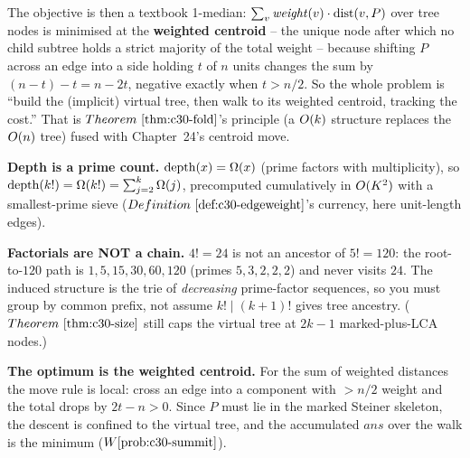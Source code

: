 The objective is then a textbook 1-median: \(\sum_v \mathit{weight}(v)\cdot\operatorname{dist}(v,P)\) over tree
nodes is minimised at the \textbf{weighted centroid} -- the unique node after which no child
subtree holds a strict majority of the total weight -- because shifting \(P\) across an edge into
a side holding \(t\) of \(n\) units changes the sum by \((n-t)-t=n-2t\), negative exactly when
\(t>n/2\). So the whole problem is ``build the (implicit) virtual tree, then walk to its weighted
centroid, tracking the cost.'' That is \(\thmref{c30-fold}\)'s principle (a \(O(k)\) structure
replaces the \(O(n)\) tree) fused with Chapter~24's centroid move.

\begin{observation}
\textbf{Depth is a prime count.} \(\operatorname{depth}(x)=\Omega(x)\) (prime factors with multiplicity), so
\(\operatorname{depth}(k!)=\Omega(k!)=\sum_{j=2}^{k}\Omega(j)\), precomputed cumulatively in \(O(K^2)\) with a
smallest-prime sieve (\(\defref{c30-edgeweight}\)'s currency, here unit-length edges).
\end{observation}
\begin{observation}
\textbf{Factorials are NOT a chain.} \(4!=24\) is not an ancestor of \(5!=120\): the root-to-\(120\)
path is \(1,5,15,30,60,120\) (primes \(5,3,2,2,2\)) and never visits \(24\). The induced structure
is the trie of \emph{decreasing} prime-factor sequences, so you must group by common prefix, not
assume \(k!\mid (k{+}1)!\) gives tree ancestry. (\(\thmref{c30-size}\) still caps the virtual tree
at \(2k-1\) marked-plus-LCA nodes.)
\end{observation}
\begin{observation}
\textbf{The optimum is the weighted centroid.} For the sum of weighted distances the move rule is
local: cross an edge into a component with \(>n/2\) weight and the total drops by \(2t-n>0\).
Since \(P\) must lie in the marked Steiner skeleton, the descent is confined to the virtual tree,
and the accumulated \(\mathit{ans}\) over the walk is the minimum (\(\probref{c30-summit}\)).
\end{observation}

